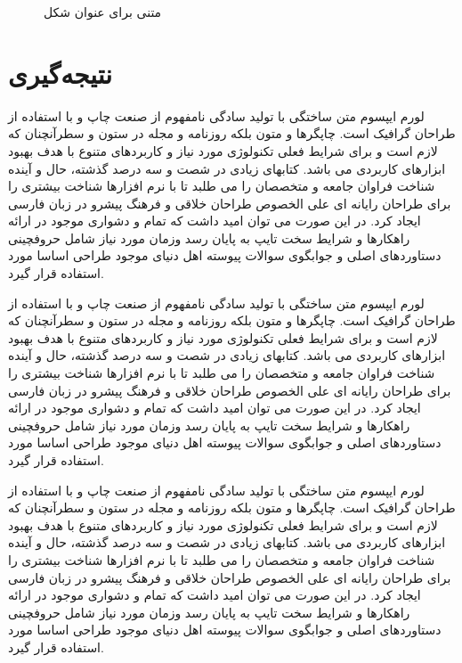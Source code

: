 \begin{figure}[t]
\caption{متنی برای عنوان شکل}
\end{figure}

\section{نتیجه‌گیری}
لورم ایپسوم متن ساختگی با تولید سادگی نامفهوم از صنعت چاپ و با استفاده از طراحان گرافیک است. چاپگرها و متون بلکه روزنامه و مجله در ستون و سطرآنچنان که لازم است و برای شرایط فعلی تکنولوژی مورد نیاز و کاربردهای متنوع با هدف بهبود ابزارهای کاربردی می باشد. کتابهای زیادی در شصت و سه درصد گذشته، حال و آینده شناخت فراوان جامعه و متخصصان را می طلبد تا با نرم افزارها شناخت بیشتری را برای طراحان رایانه ای علی الخصوص طراحان خلاقی و فرهنگ پیشرو در زبان فارسی ایجاد کرد. در این صورت می توان امید داشت که تمام و دشواری موجود در ارائه راهکارها و شرایط سخت تایپ به پایان رسد وزمان مورد نیاز شامل حروفچینی دستاوردهای اصلی و جوابگوی سوالات پیوسته اهل دنیای موجود طراحی اساسا مورد استفاده قرار گیرد.

لورم ایپسوم متن ساختگی با تولید سادگی نامفهوم از صنعت چاپ و با استفاده از طراحان گرافیک است. چاپگرها و متون بلکه روزنامه و مجله در ستون و سطرآنچنان که لازم است و برای شرایط فعلی تکنولوژی مورد نیاز و کاربردهای متنوع با هدف بهبود ابزارهای کاربردی می باشد. کتابهای زیادی در شصت و سه درصد گذشته، حال و آینده شناخت فراوان جامعه و متخصصان را می طلبد تا با نرم افزارها شناخت بیشتری را برای طراحان رایانه ای علی الخصوص طراحان خلاقی و فرهنگ پیشرو در زبان فارسی ایجاد کرد. در این صورت می توان امید داشت که تمام و دشواری موجود در ارائه راهکارها و شرایط سخت تایپ به پایان رسد وزمان مورد نیاز شامل حروفچینی دستاوردهای اصلی و جوابگوی سوالات پیوسته اهل دنیای موجود طراحی اساسا مورد استفاده قرار گیرد.

لورم ایپسوم متن ساختگی با تولید سادگی نامفهوم از صنعت چاپ و با استفاده از طراحان گرافیک است. چاپگرها و متون بلکه روزنامه و مجله در ستون و سطرآنچنان که لازم است و برای شرایط فعلی تکنولوژی مورد نیاز و کاربردهای متنوع با هدف بهبود ابزارهای کاربردی می باشد. کتابهای زیادی در شصت و سه درصد گذشته، حال و آینده شناخت فراوان جامعه و متخصصان را می طلبد تا با نرم افزارها شناخت بیشتری را برای طراحان رایانه ای علی الخصوص طراحان خلاقی و فرهنگ پیشرو در زبان فارسی ایجاد کرد. در این صورت می توان امید داشت که تمام و دشواری موجود در ارائه راهکارها و شرایط سخت تایپ به پایان رسد وزمان مورد نیاز شامل حروفچینی دستاوردهای اصلی و جوابگوی سوالات پیوسته اهل دنیای موجود طراحی اساسا مورد استفاده قرار گیرد.

